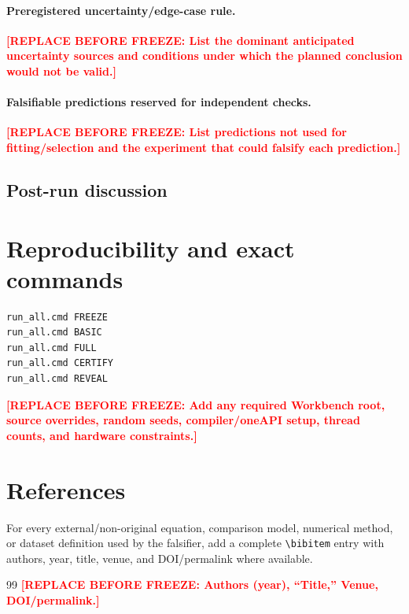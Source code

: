 \documentclass[11pt,a4paper]{article}
\newcommand{\SSTTODO}[1]{\ifmmode\text{\color{red}\bfseries TODO}\else\textcolor{red}{\textbf{[REPLACE BEFORE FREEZE: #1]}}\fi}
\begin{document}
\paragraph{Preregistered uncertainty/edge-case rule.}
\SSTTODO{List the dominant anticipated uncertainty sources and conditions under which the planned conclusion would not be valid.}

\paragraph{Falsifiable predictions reserved for independent checks.}
\SSTTODO{List predictions not used for fitting/selection and the experiment that could falsify each prediction.}

\subsection{Post-run discussion}

\section{Reproducibility and exact commands}
\begin{verbatim}
run_all.cmd FREEZE
run_all.cmd BASIC
run_all.cmd FULL
run_all.cmd CERTIFY
run_all.cmd REVEAL
\end{verbatim}
\SSTTODO{Add any required Workbench root, source overrides, random seeds, compiler/oneAPI setup, thread counts, and hardware constraints.}

\section{References}
For every external/non-original equation, comparison model, numerical method, or dataset definition used by the falsifier, add a complete \verb|\bibitem| entry with authors, year, title, venue, and DOI/permalink where available.

\begin{thebibliography}{99}
\SSTTODO{Authors (year), ``Title,'' Venue, DOI/permalink.}
\end{thebibliography}
\end{document}
